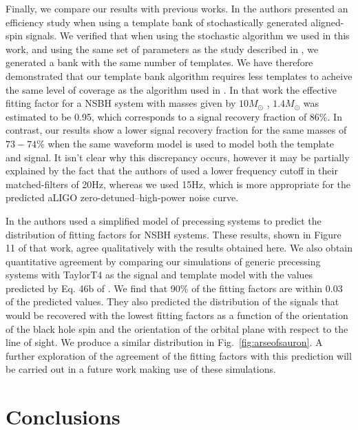 Finally, we compare our results with previous works. In \cite{Ajith:2012mn}
the authors presented an efficiency study when using a template bank of 
stochastically generated aligned-spin signals. We verified that when using the 
stochastic algorithm we used in this work, and using the same set of parameters 
as the study described in \cite{Ajith:2012mn}, we generated a bank with the 
same number of templates. We have therefore demonstrated that our template bank 
algorithm requires less templates to acheive the same level of coverage as the 
algorithm used in \cite{Ajith:2012mn}. In that work the effective fitting 
factor for a \ac{NSBH} system with masses given by $10 M_{\odot}$ ,
$1.4 M_{\odot}$ was estimated to be 0.95, which corresponds to a
signal recovery fraction of 86\%.
In contrast, our results show a lower signal recovery fraction 
for the same masses of $73 - 74\%$ when the same waveform model is used to 
model both the template and signal. It isn't clear why this discrepancy 
occurs, however it may be partially explained by the fact that 
the authors of \cite{Ajith:2012mn} used a lower frequency cutoff in their 
matched-filters of 20Hz, whereas we used 15Hz, which is more appropriate for the 
predicted \ac{aLIGO} zero-detuned--high-power noise curve. 

In \cite{Brown:2012gs} the authors used a simplified model of precessing systems
to predict the distribution of fitting
factors for \ac{NSBH} systems. These results, shown in Figure 11 of that work,
agree qualitatively with the results obtained here.
We also obtain quantitative agreement by comparing our simulations of 
generic precessing systems with TaylorT4 as the signal and template model with 
the values predicted by Eq. 46b of \cite{Brown:2012gs}. We find that 90\% of 
the fitting factors are within $0.03$ of the predicted values.
They also predicted the 
distribution of the signals that would be recovered with the lowest fitting 
factors as a function of the orientation of the black hole spin and the 
orientation of the orbital plane with respect to the line of sight. We produce 
a similar distribution in Fig.~\ref{fig:arseofsauron}. 
A further exploration of the agreement of the fitting factors with 
this prediction will be carried out in a future work making use of these 
simulations.

\section{Conclusions}

